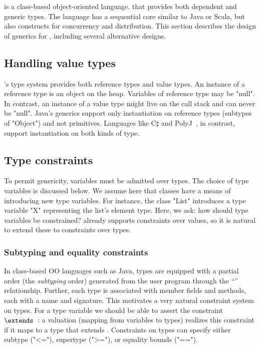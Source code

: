 \Xten{} is a class-based object-oriented language.
that provides both dependent and generic types.
The language has a sequential core similar to Java or Scala, but
also
constructs for concurrency and distribution.
This section describes the design of generics for \Xten,
including several alternative designs.


\subsection{Handling value types}

\Xten's type system provides both reference types and value
types.  An instance of a reference type is an object on the
heap.  Variables of reference type may be \xcd"null".
In contrast, an instance of a value type might live on the call stack
and can never be \xcd"null".  Java's generics support only 
instantiation on reference types (subtypes of \xcd"Object") and
not primitives.  Languages like C$\sharp$ and  PolyJ~\cite{java-popl97}, in contrast, support
instantiation on both kinds of type.


\subsection{Type constraints}

To permit genericity, variables  must be admitted over types.
The choice of type variables is discussed below.  We assume here
that classes have a means of introducing new type variables.
For instance,
the class \xcd"List" introduces a type variable \xcd"X"
representing the list's element type.
Here, we ask: how should type variables be constrained?
\Xten already supports constraints over values, so it is natural
to extend these to constraints over types.

\subsubsection{Subtyping and equality constraints}

In class-based OO languages such as Java,
types are equipped with a partial
order (the \emph{subtyping} order) generated from the user program
through the ``'' relationship.  Further, each type is
associated with member fields and methods, each with a
name and signature.
This motivates a very natural constraint system on types.  For a type
variable  we should be able to assert the constraint
~$\extends$~: a valuation (mapping from variables to types) realizes
this constraint if it maps  to a type that extends .
Constraints on types can specify either subtype (\xcd"<="),
supertype (\xcd">="), or equality bounds (\xcd"==").

